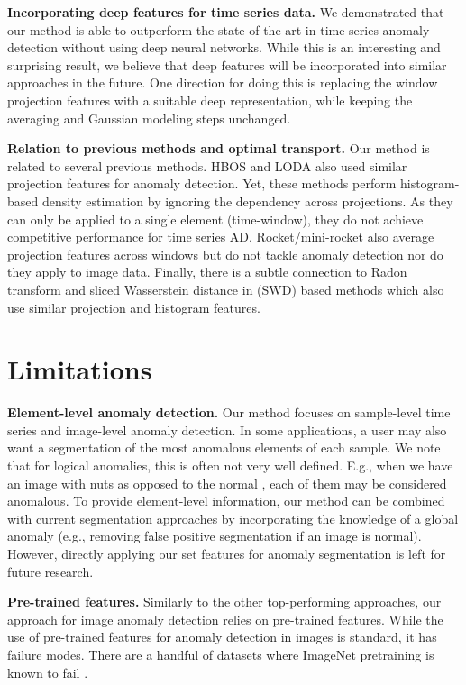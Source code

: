 \documentclass{article}
\begin{document}
\textbf{Incorporating deep features for time series data.} We demonstrated that our method is able to outperform the state-of-the-art in time series anomaly detection without using deep neural networks. While this is an interesting and surprising result, we believe that deep features will be incorporated into similar approaches in the future. One direction for doing this is replacing the window projection features with a suitable deep representation, while keeping the averaging and Gaussian modeling steps unchanged. 

\textbf{Relation to previous methods and optimal transport.} Our method is related to several previous methods. HBOS \citep{goldstein2012histogram} and LODA \citep{pevny2016loda} also used similar projection features for anomaly detection. Yet, these methods perform histogram-based density estimation by ignoring the dependency across projections. As they can only be applied to a single element (time-window), they do not achieve competitive performance for time series AD. Rocket/mini-rocket \citep{dempster2020rocket, dempster2021minirocket} also average projection features across windows but do not tackle anomaly detection nor do they apply to image data. Finally, there is a subtle connection to Radon transform \citep{kolouri2015radon} and sliced Wasserstein distance in  (SWD) based methods \citep{bonneel2015sliced} which also use similar projection and histogram features. 

\section{Limitations} 

\textbf{Element-level anomaly detection.} Our method focuses on sample-level time series and image-level anomaly detection. In some applications, a user may also want a segmentation of the most anomalous elements of each sample. We note that for logical anomalies, this is often not very well defined. E.g., when we have an image with  nuts as opposed to the normal , each of them may be considered anomalous. To provide element-level information, our method can be combined with current segmentation approaches by incorporating the knowledge of a global anomaly (e.g., removing false positive segmentation if an image is normal). However, directly applying our set features for anomaly segmentation is left for future research. 

\textbf{Pre-trained features.} Similarly to the other top-performing approaches, our approach for image anomaly detection relies on pre-trained features. While the use of pre-trained features for anomaly detection in images is standard, it has failure modes. There are a handful of datasets where ImageNet pretraining is known to fail \cite{yousef2023no}. 
\end{document}
